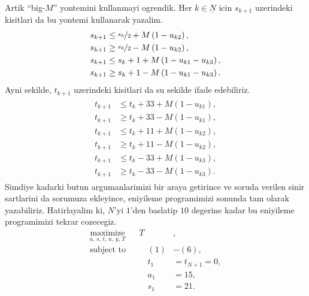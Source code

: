 Artik ``big-$M$'' yontemini kullanmayi ogrendik. Her $k \in \underline{N}$ icin
$s_{k+1}$ uzerindeki kisitlari da bu yontemi kullanarak yazalim.
%
\begin{align}
    \begin{split}
        s_{k+1} &\leq \nicefrac{s_k}{2} + M\left( 1 - u_{k2} \right), \\
        s_{k+1} &\geq \nicefrac{s_k}{2} - M\left( 1 - u_{k2} \right), \\
        s_{k+1} &\leq s_k + 1 + M\left( 1 - u_{k1} - u_{k3} \right), \\
        s_{k+1} &\geq s_k + 1 - M\left( 1 - u_{k1} - u_{k3} \right).
    \end{split}
    \label{eq:s_constraints_big_M}
\end{align}
%
Ayni sekilde, $t_{k+1}$ uzerindeki kisitlari da su sekilde ifade edebiliriz.
%
\begin{align}
    \begin{split}
        t_{k+1} &\leq t_k + 33 + M\left( 1 - u_{k1} \right), \\
        t_{k+1} &\geq t_k + 33 - M\left( 1 - u_{k1} \right), \\
        t_{k+1} &\leq t_k + 11 + M\left( 1 - u_{k2} \right), \\
        t_{k+1} &\geq t_k + 11 - M\left( 1 - u_{k2} \right), \\
        t_{k+1} &\leq t_k - 33 + M\left( 1 - u_{k3} \right), \\
        t_{k+1} &\geq t_k - 33 - M\left( 1 - u_{k3} \right).
    \end{split}
    \label{eq:t_constraints_big_M}
\end{align}
%
Simdiye kadarki butun argumanlarimizi bir araya getirince ve soruda verilen
sinir sartlarini da sorumuza ekleyince, eniyileme programimizi sonunda tam
olarak yazabiliriz. Hatirlayalim ki, $N$'yi $1$'den baslatip $10$ degerine kadar
bu eniyileme programimizi tekrar cozecegiz.
%
\begin{equation}
    \begin{aligned}
        \underset{a,\, s, \, t, \, u, \, y, \, T }{\textrm{maximize}} && T &, \\
        \textrm{subject to} 
        &&\quad (1) &-(6), \\
        &&\quad t_1 &= t_{N+1} = 0, \\
        &&\quad a_1 &= 15, \\
        &&\quad s_1 &= 21.  \\
    \end{aligned}    
    \label{eq:optimization}
\end{equation}